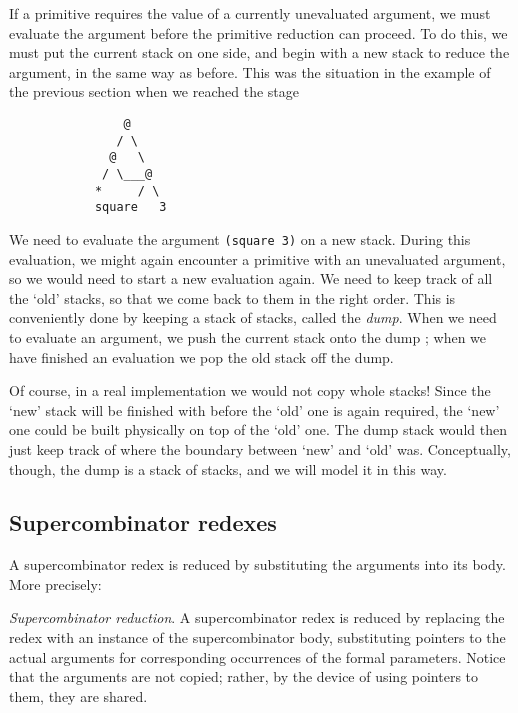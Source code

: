 If a primitive
requires the value of a currently unevaluated argument,
we must
evaluate the argument before the primitive reduction can proceed.
To do this, we must put the current stack on one
side, and begin with a new stack to reduce the argument, in the same
way as before.  This was the situation in the example of the previous section
when we reached the stage
\begin{verbatim}
                @
               / \
              @   \
             / \___@
            *     / \
            square   3
\end{verbatim}

We need to evaluate the argument \mbox{\tt (square\ 3)} on a new
stack.  During this evaluation, we might again encounter a primitive
with an unevaluated argument, so we would need to start a new evaluation
again.  We need to keep track of all the `old' stacks, so that we come
back to them in the right order.  This is conveniently done by keeping
a stack of stacks, called the {\em dump}.  When we need to evaluate an
argument, we push the current stack onto the dump\index{dump}%
; when we have finished
an evaluation we pop the old stack off the dump.

Of course, in a real implementation we would not copy whole stacks!
Since the `new' stack will be finished with before the `old' one is again
required, the `new' one could be built
physically on top of the `old' one.
The dump stack would then just keep track of where the boundary between
`new' and `old' was.  Conceptually, though, the dump is a stack of stacks,
and we will model it in this way.

\subsection{Supercombinator redexes}
\label{sect:templ:supercomb-review}

A supercombinator redex is reduced by substituting the arguments into
its body.  More precisely:
\begin{important}
{\em Supercombinator reduction}.  A supercombinator redex is reduced
by replacing the
redex with an instance of the
supercombinator body, substituting pointers to the actual arguments for
corresponding occurrences of the formal parameters.
Notice that the arguments are
not copied; rather, by the device of using pointers
to them, they are shared.\index{instantiation}
\end{important}

